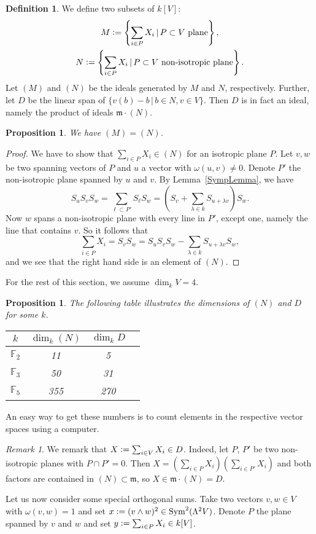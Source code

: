 \documentclass{alggeom}
\DeclareMathOperator{\Sym}{Sym}
\newcommand{\defIs}{\vcentcolon=}
\theoremstyle{plain}
\newtheorem{proposition}[theorem]{Proposition}
\theoremstyle{definition}
\newtheorem{definition}[theorem]{Definition}
\theoremstyle{remark}
\newtheorem{rmk}[theorem]{Remark}
\begin{document}
\begin{definition} \label{SymplecticIdeal}
We define two subsets of $k[V]$:
\begin{gather*}
M \defIs  \left\{\sum_{i\in P}X_i \,|\, P\subset V \text{ plane}\right\}, \\
N  \defIs  \left\{\sum_{i\in P}X_i \,|\, P\subset V \text{ non-isotropic plane}\right\}.
\end{gather*}
Let $(M)$ and $(N)$ be the ideals generated by $M$ and $N$, respectively. 
Further, let $D$ be the linear span of $\{v(b) - b \,|\, b\in N, v\in V \}$. Then $D$ is in fact an ideal, namely the product of ideals $\mathfrak m\cdot (N)$.
\end{definition}
\begin{proposition}
We have $(M)=(N)$.
\end{proposition}
\begin{proof}
We have to show that $\sum_{i\in P}X_i \in (N)$ for an isotropic plane $P$. Let $v,w$ be two spanning vectors of $P$ and $u$ a vector with $\omega(u,v)\neq 0$. Denote $P'$ the non-isotropic plane spanned by $u $ and $v$. By Lemma~\ref{SympLemma}, we have
$$
S_uS_vS_w = \sum_{\ell\subset P'} S_{\ell}S_w= \left(S_v+\sum_{\lambda\in k}S_{u + \lambda v}\right)S_w.
$$
Now $w$ spans a non-isotropic plane with every line in $P'$, except one, namely the line that contains $v$. So it follows that
$$
\sum_{i\in P}X_i = S_vS_w = S_uS_vS_w  - \sum_{\lambda\in k} S_{u + \lambda v}S_w, 
$$
and we see that the right hand side is an element of $(N)$.
\end{proof}
For the rest of this section, we assume $\dim_k V=4$. 
\begin{proposition} \label{SymplecticIdealsDimension}
The following table illustrates the dimensions of $(N)$ and $D$ for some $k$.
\vspace{2mm}
\begin{center}
\begin{tabular}{c||c|c|c}
 $k$ & $\dim_k(N)$ & $\dim_k D$ \\
\hline
$\mathbb F_2$   & 11 &  5  \\
$\mathbb F_3$  & 50 & 31  \\
$\mathbb F_5$  &355 &270
\end{tabular}
\end{center}
\end{proposition}
An easy way to get these numbers is to count elements in the respective vector spaces using a computer.
\begin{rmk}\label{c2}
We remark that $X\defIs \sum_{i\in V}X_i\in D$. Indeed, let $P$, $P'$ be two non-isotropic planes with $P \cap P' = 0$. Then $X = \left( \sum_{i\in P}X_i\right)\left(  \sum_{i\in P'}X_i \right)$ and both factors are contained in $(N)\subset \mathfrak m$, so $X\in \mathfrak m \cdot (N) = D$.
\end{rmk}
Let us now consider some special orthogonal sums. Take two vectors $v,w\in V$ with $\omega(v,w)=1$ and set $x\defIs  (v\wedge w)^2\in \Sym^2 (\Lambda^2V)$. Denote $P$ the plane spanned by $v$ and $w$ and set $y\defIs  \sum_{i\in P}X_i\in  k[V]$.
\end{document}
